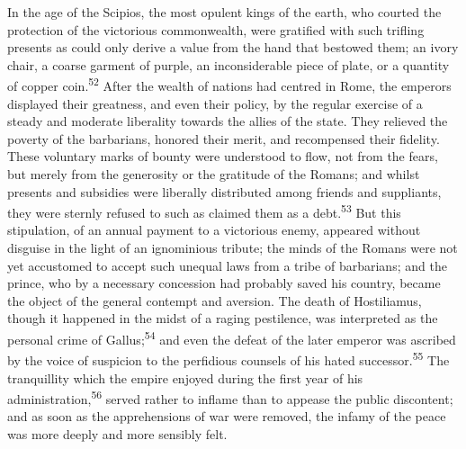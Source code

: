 In the age of the Scipios, the most opulent kings of the earth,
who courted the protection of the victorious commonwealth, were
gratified with such trifling presents as could only derive a
value from the hand that bestowed them; an ivory chair, a coarse
garment of purple, an inconsiderable piece of plate, or a
quantity of copper coin.\textsuperscript{52} After the wealth of nations had
centred in Rome, the emperors displayed their greatness, and even
their policy, by the regular exercise of a steady and moderate
liberality towards the allies of the state. They relieved the
poverty of the barbarians, honored their merit, and recompensed
their fidelity. These voluntary marks of bounty were understood
to flow, not from the fears, but merely from the generosity or
the gratitude of the Romans; and whilst presents and subsidies
were liberally distributed among friends and suppliants, they
were sternly refused to such as claimed them as a debt.\textsuperscript{53} But
this stipulation, of an annual payment to a victorious enemy,
appeared without disguise in the light of an ignominious tribute;
the minds of the Romans were not yet accustomed to accept such
unequal laws from a tribe of barbarians; and the prince, who by a
necessary concession had probably saved his country, became the
object of the general contempt and aversion. The death of
Hostiliamus, though it happened in the midst of a raging
pestilence, was interpreted as the personal crime of Gallus;\textsuperscript{54}
and even the defeat of the later emperor was ascribed by the
voice of suspicion to the perfidious counsels of his hated
successor.\textsuperscript{55} The tranquillity which the empire enjoyed during
the first year of his administration,\textsuperscript{56} served rather to inflame
than to appease the public discontent; and as soon as the
apprehensions of war were removed, the infamy of the peace was
more deeply and more sensibly felt.





